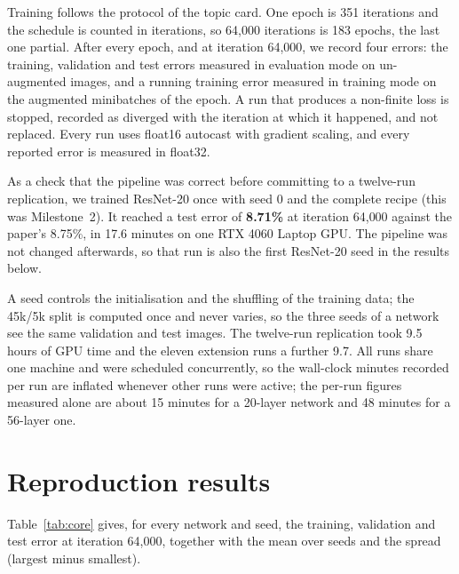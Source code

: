 \documentclass[11pt,a4paper]{article}
\begin{document}
Training follows the protocol of the topic card. One epoch is 351 iterations
and the schedule is counted in iterations, so 64{,}000 iterations is 183
epochs, the last one partial. After every epoch, and at iteration 64{,}000, we
record four errors: the training, validation and test errors measured in
evaluation mode on un-augmented images, and a running training error measured in
training mode on the augmented minibatches of the epoch. A run that produces a
non-finite loss is stopped, recorded as diverged with the iteration at which it
happened, and not replaced. Every run uses float16 autocast with gradient
scaling, and every reported error is measured in float32.

As a check that the pipeline was correct before committing to a twelve-run
replication, we trained ResNet-20 once with seed 0 and the complete recipe
(this was Milestone~2). It reached a test error of \textbf{8.71\%} at iteration
64{,}000 against the paper's 8.75\%, in 17.6 minutes on one RTX 4060 Laptop GPU.
The pipeline was not changed afterwards, so that run is also the first ResNet-20
seed in the results below.

A seed controls the initialisation and the shuffling of the training data; the
45k/5k split is computed once and never varies, so the three seeds of a network
see the same validation and test images. The twelve-run replication took 9.5
hours of GPU time and the eleven extension runs a further 9.7. All runs share
one machine and were scheduled concurrently, so the wall-clock minutes recorded
per run are inflated whenever other runs were active; the per-run figures
measured alone are about 15 minutes for a 20-layer network and 48 minutes for a
56-layer one.

\section{Reproduction results}

Table~\ref{tab:core} gives, for every network and seed, the training,
validation and test error at iteration 64{,}000, together with the mean over
seeds and the spread (largest minus smallest).
\end{document}

